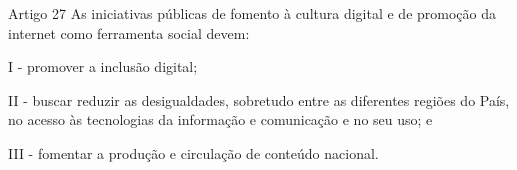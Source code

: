 \begin{frame}{Artigo 27}
As iniciativas públicas de fomento à cultura digital e de promoção da internet como ferramenta social devem:

I - promover a inclusão digital;

II - buscar reduzir as desigualdades, sobretudo entre as diferentes regiões do País, no acesso às tecnologias da informação e comunicação e no seu uso; e

III - fomentar a produção e circulação de conteúdo nacional.

\end{frame}